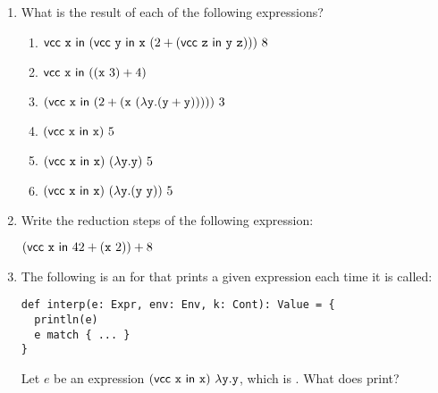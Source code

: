 \begin{enumerate}
  \item What is the result of each of the following expressions?

\begin{enumerate}
  \item $\evcc{\cx}{(\evcc{\cy}{\cx\ (2+(\evcc{\cz}{\cy\ \cz}))})\ 8}$
  \item $\textsf{vcc}\ \texttt{x}\ \textsf{in}\ ((\texttt{x}\ 3)+4)$
  \item $(\textsf{vcc}\ \texttt{x}\ \textsf{in}\ (2+(\texttt{x}\ (\lambda\texttt{y}.(\texttt{y}+\texttt{y})))))\ 3$
  \item $\eapp{\eapp{(\evcc{\cx}{\cx})}{5}}$
  \item $(\textsf{vcc}\ \texttt{x}\ \textsf{in}\ \texttt{x})\ (\lambda\texttt{y}.\texttt{y})\ 5$
  \item $(\textsf{vcc}\ \texttt{x}\ \textsf{in}\ \texttt{x})\ (\lambda\texttt{y}.(\texttt{y}\ \texttt{y}))\ 5$
\end{enumerate}

  \item Write the reduction steps of the following expression:

    $(\evcc{\cx}{42+(\cx\ 2)})+8$

\item The following is an  for \lang that prints a given
expression each time it is called:

\begin{verbatim}
def interp(e: Expr, env: Env, k: Cont): Value = {
  println(e)
  e match { ... }
}
\end{verbatim}

Let $e$ be an expression $(\textsf{vcc}\ \texttt{x}\ \textsf{in}\ \texttt{x})\ \lambda\texttt{y}.\texttt{y}$, which is
. What does  print?

\end{enumerate}
